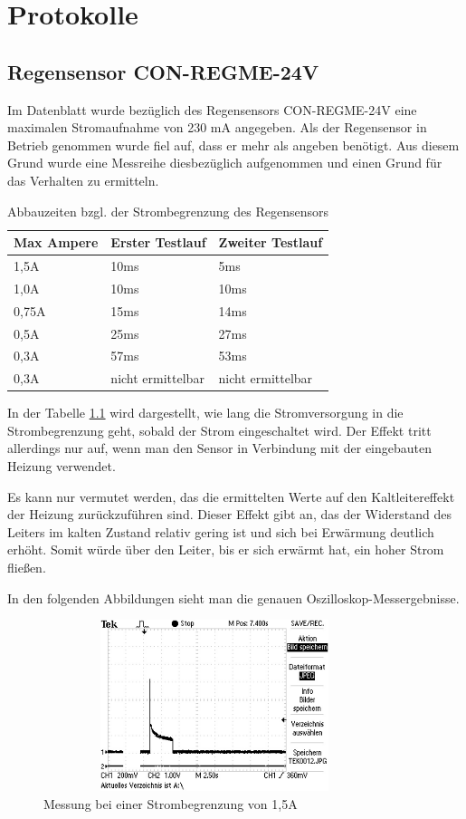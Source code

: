 \chapter{Protokolle}
	\section{Regensensor CON-REGME-24V}
		Im Datenblatt wurde bezüglich des Regensensors CON-REGME-24V eine maximalen Stromaufnahme von 230 mA angegeben. Als der Regensensor in Betrieb genommen wurde fiel auf, dass er mehr als angeben benötigt. Aus diesem Grund wurde eine Messreihe diesbezüglich aufgenommen und einen Grund für das Verhalten zu ermitteln.
		
		\begin{table}[H]
			\centering
			\begin{tabular}{|l|l|l|}
				\hline \textbf{Max Ampere} & \textbf{Erster Testlauf} & \textbf{Zweiter Testlauf}\\
				\hline 1,5A& 10ms & 5ms\\
				\hline 1,0A& 10ms & 10ms\\ 
				\hline 0,75A& 15ms & 14ms\\ 
				\hline 0,5A& 25ms & 27ms\\ 
				\hline 0,3A& 57ms & 53ms\\ 
				\hline 0,3A& nicht ermittelbar & nicht ermittelbar\\
				\hline
			\end{tabular}
			\caption{Abbauzeiten bzgl. der Strombegrenzung des Regensensors}
			\label{table:RainmA}
		\end{table}
		
		In der Tabelle \ref{table:RainmA} wird dargestellt, wie lang die Stromversorgung in die Strombegrenzung geht, sobald der Strom eingeschaltet wird. Der Effekt tritt allerdings nur auf, wenn man den Sensor in Verbindung mit der eingebauten Heizung verwendet.
		
		Es kann nur vermutet werden, das die ermittelten Werte auf den Kaltleitereffekt der Heizung zurückzuführen sind. Dieser Effekt gibt an, das der Widerstand des Leiters im kalten Zustand relativ gering ist und sich bei Erwärmung deutlich erhöht. Somit würde über den Leiter, bis er sich erwärmt hat, ein hoher Strom fließen.
		
		In den folgenden Abbildungen sieht man die genauen Oszilloskop-Messergebnisse.
		
		\begin{figure}[H]
		\centering
		\includegraphics[width=10cm,height=5cm]{./Grafiken/TEK0012}
		\caption{Messung bei einer Strombegrenzung von 1,5A}
		\label{fig:TEK0012}
		\end{figure}
		
